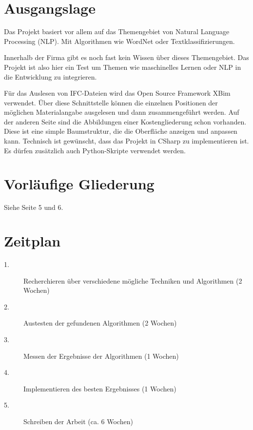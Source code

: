 \begin{onehalfspace}
\section{Ausgangslage}

Das Projekt basiert vor allem auf das Themengebiet von Natural Language Processing (NLP). Mit Algorithmen wie WordNet oder Textklassifizierungen.

Innerhalb der Firma gibt es noch fast kein Wissen über dieses Themengebiet. Das Projekt ist also hier ein Test um Themen wie maschinelles Lernen oder NLP in die Entwicklung zu integrieren.

Für das Auslesen von IFC-Dateien wird das Open Source Framework XBim verwendet. Über diese Schnittstelle können die einzelnen Positionen der möglichen Materialangabe ausgelesen und dann zusammengeführt werden. Auf der anderen Seite sind die Abbildungen einer Kostengliederung schon vorhanden. Diese ist eine simple Baumstruktur, die die Oberfläche anzeigen und anpassen kann.
Technisch ist gewünscht, dass das Projekt in CSharp zu implementieren ist. Es dürfen zusätzlich auch Python-Skripte verwendet werden.

\section{Vorläufige Gliederung}
Siehe Seite 5 und 6.

\section{Zeitplan}

\begin{description}
	\item[1.]
	Recherchieren über verschiedene mögliche Techniken und Algorithmen (2 Wochen)
	\item[2.] 
	Austesten der gefundenen Algorithmen (2 Wochen)
	\item[3.]
	Messen der Ergebnisse der Algorithmen (1 Wochen)
	\item[4.] Implementieren des besten Ergebnisses (1 Wochen)
	\item[5.] Schreiben der Arbeit (ca. 6 Wochen)
\end{description}


\end{onehalfspace}